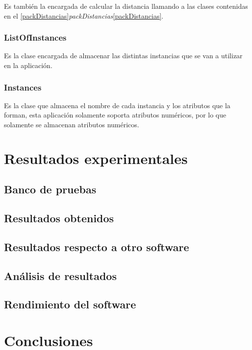\documentclass[11pt, titlepage,a4paper]{article}
\begin{document}
Es también la encargada de calcular la distancia llamando a las clases
contenidas en el
\ref{packDistancias}\textit{packDistancias}\ref{packDistancias}.

\subsubsection{ListOfInstances}
Es la clase encargada de almacenar las distintas instancias que se van a
utilizar en la aplicación.

\subsubsection{Instances}
Es la clase que almacena el nombre de cada instancia y los atributos que la
forman, esta aplicación solamente soporta atributos numéricos, por lo que
solamente se almacenan atributos numéricos.


\section{Resultados experimentales}

\subsection{Banco de pruebas}

\subsection{Resultados obtenidos}

\subsection{Resultados respecto a otro software}

\subsection{Análisis de resultados}

\subsection{Rendimiento del software}

\section{Conclusiones}
\end{document}
